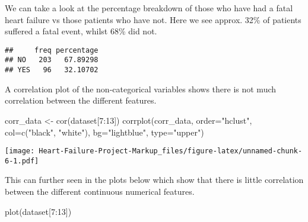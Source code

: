 \documentclass[
]{article}
\newenvironment{Shaded}{\begin{snugshade}}{\end{snugshade}}
\newcommand{\AttributeTok}[1]{\textcolor[rgb]{0.77,0.63,0.00}{#1}}
\newcommand{\DecValTok}[1]{\textcolor[rgb]{0.00,0.00,0.81}{#1}}
\newcommand{\FunctionTok}[1]{\textcolor[rgb]{0.00,0.00,0.00}{#1}}
\newcommand{\NormalTok}[1]{#1}
\newcommand{\OtherTok}[1]{\textcolor[rgb]{0.56,0.35,0.01}{#1}}
\newcommand{\SpecialCharTok}[1]{\textcolor[rgb]{0.00,0.00,0.00}{#1}}
\newcommand{\StringTok}[1]{\textcolor[rgb]{0.31,0.60,0.02}{#1}}
\begin{document}
We can take a look at the percentage breakdown of those who have had a
fatal heart failure vs those patients who have not. Here we see approx.
32\% of patients suffered a fatal event, whilst 68\% did not.

\begin{Shaded}
\end{Shaded}

\begin{verbatim}
##     freq percentage
## NO   203   67.89298
## YES   96   32.10702
\end{verbatim}

A correlation plot of the non-categorical variables shows there is not
much correlation between the different features.

\begin{Shaded}
\begin{Highlighting}[]
\NormalTok{corr\_data }\OtherTok{\textless{}{-}} \FunctionTok{cor}\NormalTok{(dataset[}\DecValTok{7}\SpecialCharTok{:}\DecValTok{13}\NormalTok{])}
\FunctionTok{corrplot}\NormalTok{(corr\_data, }\AttributeTok{order=}\StringTok{"hclust"}\NormalTok{, }\AttributeTok{col=}\FunctionTok{c}\NormalTok{(}\StringTok{"black"}\NormalTok{, }\StringTok{"white"}\NormalTok{), }\AttributeTok{bg=}\StringTok{"lightblue"}\NormalTok{, }\AttributeTok{type=}\StringTok{"upper"}\NormalTok{)}
\end{Highlighting}
\end{Shaded}

\texttt{[image: Heart-Failure-Project-Markup\_files/figure-latex/unnamed-chunk-6-1.pdf]}

This can further seen in the plots below which show that there is little
correlation between the different continuous numerical features.

\begin{Shaded}
\begin{Highlighting}[]
\FunctionTok{plot}\NormalTok{(dataset[}\DecValTok{7}\SpecialCharTok{:}\DecValTok{13}\NormalTok{])}
\end{Highlighting}
\end{Shaded}
\end{document}

